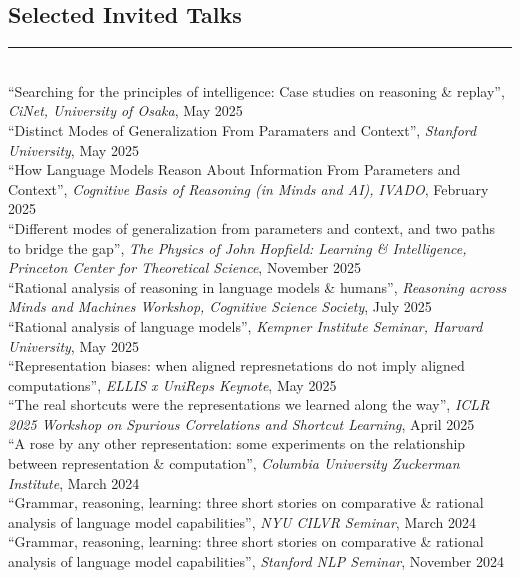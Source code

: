 \documentclass[margin]{res}
\begin{document}
\begin{resume}
\vspace{1pt}\section{Selected Invited Talks} \vspace{-15pt} \rule{\textwidth}{0.5pt} \\[3pt]
{``Searching for the principles of intelligence: Case studies on reasoning \& replay'',} \textit{CiNet, University of Osaka}, May 2025\\[3pt] 
{``Distinct Modes of Generalization From Paramaters and Context'',} \textit{Stanford University}, May 2025\\[3pt] 
{``How Language Models Reason About Information From Parameters and Context'',} \textit{Cognitive Basis of Reasoning (in Minds and AI), IVADO}, February 2025\\[3pt] 
{``Different modes of generalization from parameters and context, and two paths to bridge the gap'',} \textit{The Physics of John Hopfield: Learning \& Intelligence, Princeton Center for Theoretical Science}, November 2025\\[3pt] 
{``Rational analysis of reasoning in language models \& humans'',} \textit{Reasoning across Minds and Machines Workshop, Cognitive Science Society}, July 2025\\[3pt] 
{``Rational analysis of language models'',} \textit{Kempner Institute Seminar, Harvard University}, May 2025\\[3pt] 
{``Representation biases: when aligned represnetations do not imply aligned computations'',} \textit{ELLIS x UniReps Keynote}, May 2025\\[3pt] 
{``The real shortcuts were the representations we learned along the way'',} \textit{ICLR 2025 Workshop on Spurious Correlations and Shortcut Learning}, April 2025\\[3pt] 
{``A rose by any other representation: some experiments on the relationship between representation \& computation'',} \textit{Columbia University Zuckerman Institute}, March 2024\\[3pt] 
{``Grammar, reasoning, learning: three short stories on comparative \& rational analysis of language model capabilities'',} \textit{NYU CILVR Seminar}, March 2024\\[3pt] 
{``Grammar, reasoning, learning: three short stories on comparative \& rational analysis of language model capabilities'',} \textit{Stanford NLP Seminar}, November 2024\\[3pt] 

\end{resume}
\end{document}
